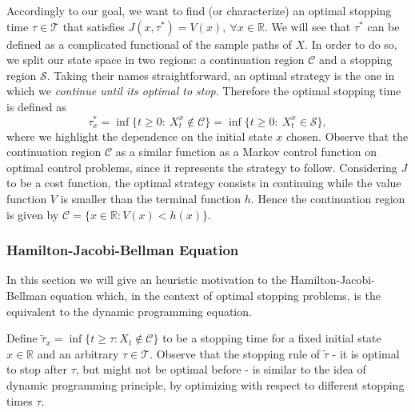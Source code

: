 Accordingly to our goal, we want to find (or characterize) an optimal stopping time $\tau\in \mathcal{T}$ that satisfies $J(x,\tau^*)=V(x), \ \forall x \in \mathds{R}$. We will see that $\tau^*$ can be defined as a complicated functional of the sample paths of $X$. In order to do so, we split our state space in two regions: a continuation region $\mathcal{C}$ and a stopping region $\mathcal{S}$. Taking their names straightforward, an optimal strategy is the one in which we \textit{continue until its optimal to stop}. Therefore the optimal stopping time is defined as
\begin{equation}
\tau_x^*=\inf\{ t \geq0: \ X^x_t \notin \mathcal{C} \}
=\inf\{ t \geq0: \ X^x_t \in \mathcal{S} \},
\label{stop}
\end{equation}
where we highlight the dependence on the initial state $x$ chosen. Observe that the continuation region $\mathcal{C}$ as a similar function as a Markov control function on optimal control problems, since it represents the strategy to follow.
Considering $J$ to be a cost function, the optimal strategy consists in continuing while the value function $V$ is smaller than the terminal function $h$. Hence the continuation region is given by $\mathcal{C}=\{ x\in \mathds{R}: V(x)<h(x) \}$.


\subsubsection{Hamilton-Jacobi-Bellman Equation}

In this section we will give an heuristic motivation to the Hamilton-Jacobi-Bellman equation which, in the context of optimal stopping problems, is the equivalent to the dynamic programming equation.

Define $\tilde{\tau}_x= \inf \{ t \geq \tau: X_t \notin \mathcal{C} \}$ to be a stopping time for a fixed initial state $x \in \mathds{R}$ and an arbitrary $\tau \in \mathcal{T}$.
Observe that the stopping rule of $\tilde{\tau}$ - it is optimal to stop after $\tau$, but might not be optimal before - is similar to the idea of dynamic programming principle, by optimizing with respect to different stopping times $\tau$.

